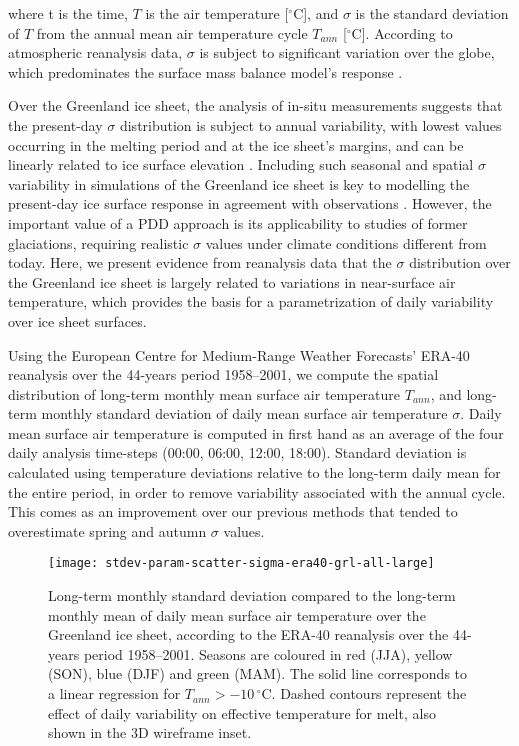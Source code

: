 \documentclass[review]{igs}
\begin{document}
where t is the time, $T$ is the air temperature [$^\circ$C], and $\sigma$ is the standard deviation of $T$ from the annual mean air temperature cycle $T_{ann}$ [$^\circ$C]. According to atmospheric reanalysis data, $\sigma$ is subject to significant variation over the globe, which predominates the surface mass balance model’s response \citep{seguinot-2013}.

Over the Greenland ice sheet, the analysis of in-situ measurements suggests that the present-day $\sigma$ distribution is subject to annual variability, with lowest values occurring in the melting period and at the ice sheet's margins, and can be linearly related to ice surface elevation \citep{fausto-etal-2009,fausto-etal-2011}. Including such seasonal and spatial $\sigma$ variability in simulations of the Greenland ice sheet is key to modelling the present-day ice surface response in agreement with observations \citep{rogozhina-rau-inpress}. However, the important value of a PDD approach is its applicability to studies of former glaciations, requiring realistic $\sigma$ values under climate conditions different from today. Here, we present evidence from reanalysis data that the $\sigma$ distribution over the Greenland ice sheet is largely related to variations in near-surface air temperature, which provides the basis for a parametrization of daily variability over ice sheet surfaces.

Using the European Centre for Medium-Range Weather Forecasts’ ERA-40 reanalysis \citep{uppala-etal-2005} over the 44-years period 1958--2001, we compute the spatial distribution of long-term monthly mean surface air temperature $T_{ann}$, and long-term monthly standard deviation of daily mean surface air temperature $\sigma$. Daily mean surface air temperature is computed in first hand as an average of the four daily analysis time-steps (00:00, 06:00, 12:00, 18:00). Standard deviation is calculated using temperature deviations relative to the long-term daily mean for the entire period, in order to remove variability associated with the annual cycle. This comes as an improvement over our previous methods \citep{seguinot-2013,rogozhina-rau-inpress} that tended to overestimate spring and autumn $\sigma$ values.

\begin{figure*}
    \centering\texttt{[image: stdev-param-scatter-sigma-era40-grl-all-large]}
    \caption{Long-term monthly standard deviation compared to the long-term monthly mean of daily mean surface air temperature over the Greenland ice sheet, according to the ERA-40 reanalysis \citep{uppala-etal-2005} over the 44-years period 1958–2001. Seasons are coloured in red (JJA), yellow (SON), blue (DJF) and green (MAM). The solid line corresponds to a linear regression for $T_{ann}>-10\,^\circ$C. Dashed contours represent the effect of daily variability on effective temperature for melt, also shown in the 3D wireframe inset.}
    \label{fig:grl}
\end{figure*}
\end{document}
